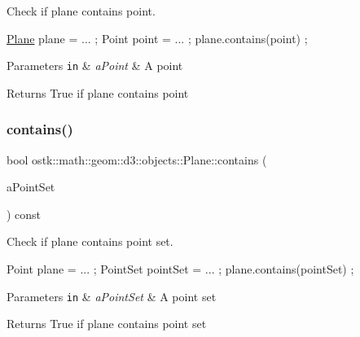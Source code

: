 Check if plane contains point. 


\begin{DoxyCode}
\hyperlink{classostk_1_1math_1_1geom_1_1d3_1_1objects_1_1_plane_ac66c2a3b3d9d7cd1fd507123091bb38f}{Plane} plane = ... ;
Point point = ... ;
plane.contains(point) ;
\end{DoxyCode}



\begin{DoxyParams}[1]{Parameters}
\mbox{\tt in}  & {\em a\+Point} & A point \\
\hline
\end{DoxyParams}
\begin{DoxyReturn}{Returns}
True if plane contains point 
\end{DoxyReturn}
\mbox{\label{classostk_1_1math_1_1geom_1_1d3_1_1objects_1_1_plane_a5113cf47ca5ef948fa8f43074291108d}} 
\subsubsection{\texorpdfstring{contains()}{contains()}\hspace{0.1cm}{\footnotesize\ttfamily [2/5]}}
{\footnotesize\ttfamily bool ostk\+::math\+::geom\+::d3\+::objects\+::\+Plane\+::contains (\begin{DoxyParamCaption}\item[{const \hyperlink{classostk_1_1math_1_1geom_1_1d3_1_1objects_1_1_point_set}{Point\+Set} \&}]{a\+Point\+Set }\end{DoxyParamCaption}) const}



Check if plane contains point set. 


\begin{DoxyCode}
Point plane = ... ;
PointSet pointSet = ... ;
plane.contains(pointSet) ;
\end{DoxyCode}



\begin{DoxyParams}[1]{Parameters}
\mbox{\tt in}  & {\em a\+Point\+Set} & A point set \\
\hline
\end{DoxyParams}
\begin{DoxyReturn}{Returns}
True if plane contains point set 
\end{DoxyReturn}
\mbox{\label{classostk_1_1math_1_1geom_1_1d3_1_1objects_1_1_plane_ad3cc8cc87bd61e8804bc4e207c662e5c}} 
